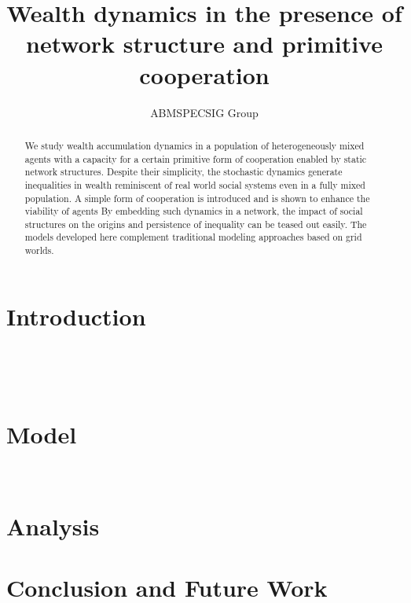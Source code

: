\documentclass{article}
\author{ABMSPECSIG Group}
\title{Wealth dynamics in the presence of network structure and primitive cooperation}
\begin{document}
\maketitle
\begin{abstract}
We study wealth accumulation dynamics in a population of heterogeneously mixed agents with a capacity for a certain primitive form of cooperation enabled by static network structures. Despite their simplicity, the stochastic dynamics generate inequalities in wealth reminiscent of real world social systems even in a fully mixed population. A simple form of cooperation is introduced and is shown to enhance the viability of agents By embedding such dynamics in a network, the impact of social structures on the origins and persistence of inequality can be teased out easily. The models developed here complement traditional modeling approaches based on grid worlds.   

\end{abstract}
\section{Introduction}
\cite{power2018cooperation,power2018}

\cite{koster2019,koster2014,koster2015,bogerhoff2015}

\cite{smith2019,nolin2012}



~\cite{ch1as_hdbk,hedstrom2011oxford,martin_lee}

~\cite{ch2as_hdbk,ch11as_hdbk,granovetter2005,hedstrom2018}

\section{Model}
~\cite{redner2001guide}
\section{Analysis}

\section{Conclusion and Future Work}

\end{document}

